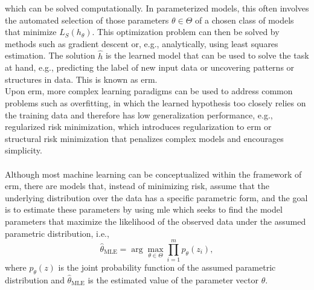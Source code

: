 \begin{tcolorbox}
    which can be solved computationally. In parameterized models, this often involves the automated selection of those parameters $\theta\in\Theta$ of a chosen class of models that minimize $L_{S}(h_\theta)$. This optimization problem can then be solved by methods such as gradient descent or, e.g., analytically, using least squares estimation. The solution $\hat{h}$ is the learned model that can be used to solve the task at hand, e.g., predicting the label of new input data or uncovering patterns or structures in data. This is known as \gls{erm}.\\
    Upon \gls{erm}, more complex learning paradigms can be used to address common problems such as overfitting, in which the learned hypothesis too closely relies on the training data and therefore has low generalization performance, e.g., regularized risk minimization, which introduces regularization to \gls{erm} or structural risk minimization that penalizes complex models and encourages simplicity.\\
    \\
    Although most machine learning can be conceptualized within the framework of \gls{erm}, there are models that, instead of minimizing risk, assume that the underlying distribution over the data has a specific parametric form, and the goal is to estimate these parameters by using \gls{mle} which seeks to find the model parameters that maximize the likelihood of the observed data under the assumed parametric distribution, i.e., \\
    \begin{equation}
    \hat{\theta}_{\text{MLE}} = \arg\max_{\theta\in\Theta}\prod_{i=1}^{m}p_{\theta}(z_i),
    \end{equation}
    where $p_{\theta}(z)$ is the joint probability function of the assumed parametric distribution and $\hat{\theta}_{\text{MLE}}$ is the estimated value of the parameter vector $\theta$.
\end{tcolorbox}

